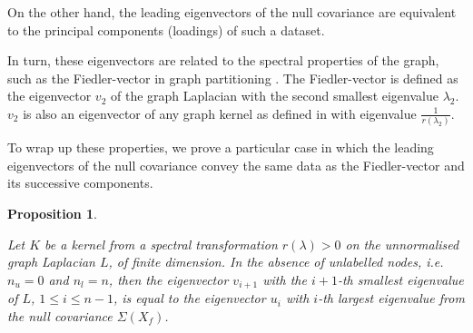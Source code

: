 \documentclass[12pt]{article}  %
\newtheorem{property}{Proposition}
\begin{document}
On the other hand, the leading eigenvectors of the null covariance are equivalent to the principal components (loadings) of such a dataset. 

In turn, these eigenvectors are related to the spectral properties of the graph, such as the Fiedler-vector in graph partitioning \cite{smola2003kernels}. 
The Fiedler-vector is defined as the eigenvector $v_2$ of the graph Laplacian with the second smallest eigenvalue $\lambda_2$. $v_2$ is also an eigenvector of any graph kernel as defined in \cite{smola2003kernels} with eigenvalue $\frac{1}{r(\lambda_2)}$. 

To wrap up these properties, we prove a particular case in which the leading eigenvectors of the null covariance convey the same data as the Fiedler-vector and its successive components. 

\begin{property}
\label{prop:eigenfiedler}

Let $K$ be a kernel from a spectral transformation $r(\lambda) > 0$ on the unnormalised graph Laplacian $L$, of finite dimension. 
In the absence of unlabelled nodes, i.e. $n_u = 0$ and $n_l = n$, then the eigenvector $v_{i+1}$ with the $i + 1$-th smallest eigenvalue of $L$, $1 \leq i \leq n - 1$, is equal to the eigenvector $u_i$ with $i$-th largest eigenvalue from the null covariance $\Sigma(X_f)$. 

\end{property}
\end{document}
